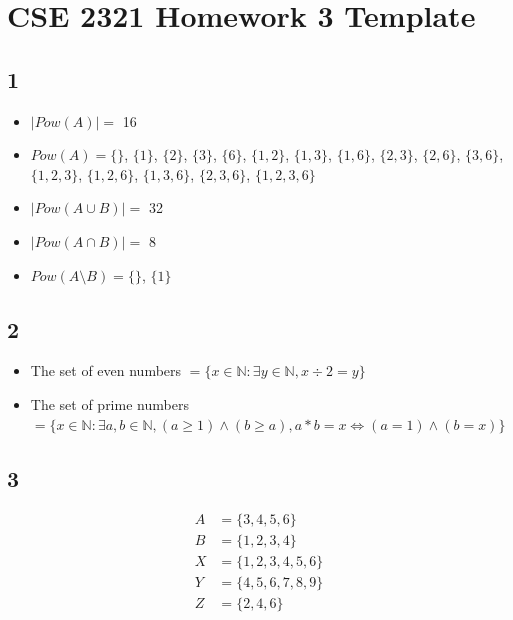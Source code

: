 \documentclass[14pt]{extarticle}
\begin{document}
\section*{CSE 2321 Homework 3 Template}


\subsection*{1}
\begin{itemize}
\item $|Pow(A)| = $
16
\item $Pow(A) = \{ \}$, 
$\{1 \}$, $\{2 \}$, $\{3 \}$, $\{6 \}$, $\{1,2 \}$, $\{ 1,3\}$, $\{ 1,6\}$, $\{ 2,3\}$, $\{2,6 \}$, $\{3,6 \}$, $\{1,2,3 \}$, $\{1,2,6 \}$, $\{1,3,6 \}$, $\{2,3,6 \}$, $\{1,2,3,6 \}$
\item $|Pow(A \cup B)| = $
32
\item $|Pow(A \cap B)| = $
8
\item $Pow(A \setminus B) = \{  \}$, $\{ 1\}$
\end{itemize}

\subsection*{2}
\begin{itemize}
\item The set of even numbers $ = \{ x \in \mathbb{N} : \exists y \in \mathbb{N}, x \div 2 = y \}$ 
\item The set of prime numbers $ = \{x \in \mathbb{N}  : \exists a,b \in \mathbb{N}, (a \geq 1) \land (b \geq a), a * b = x \iff (a = 1) \land (b = x)  \}$
\end{itemize}

\subsection*{3}
\begin{align*}
A &= \{3, 4, 5, 6 \} \\
B &= \{ 1, 2, 3, 4 \} \\
X &= \{1, 2, 3, 4, 5, 6  \} \\
Y &= \{4, 5, 6, 7, 8, 9  \} \\
Z &= \{2, 4, 6  \}
\end{align*}
\end{document}
